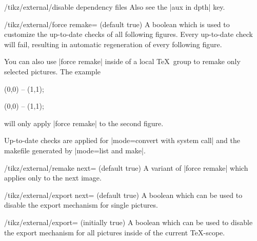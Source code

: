 {\begin{key}{/tikz/external/disable dependency files}
    Also see the |aux in dpth| key.
\end{key}

\begin{key}{/tikz/external/force remake= (default true)}
    A boolean which is used to customize the up-to-date checks of all following
    figures. Every up-to-date check will fail, resulting in automatic
    regeneration of every following figure.
\begin{codeexample}
\tikzset{external/force remake}
\end{codeexample}
    You can also use |force remake| inside of a local \TeX\ group to remake
    only selected pictures. The example
\begin{codeexample}
\tikz \draw (0,0) -- (1,1);

{
\tikzset{external/force remake}
}

\tikz \draw (0,0) -- (1,1);
\end{codeexample}
    will only apply |force remake| to the second figure.

    Up-to-date checks are applied for |mode=convert with system call| and the
    makefile generated by |mode=list and make|.
\end{key}

\begin{key}{/tikz/external/remake next= (default true)}
    A variant of |force remake| which applies only to the next image.
\end{key}

\begin{key}{/tikz/external/export next= (default true)}
    A boolean which can be used to disable the export mechanism for single pictures.
\end{key}

\begin{key}{/tikz/external/export= (initially true)}
    A boolean which can be used to disable the export mechanism for all
    pictures inside of the current \TeX-scope.
\begin{codeexample}



\end{codeexample}
\end{key}}
